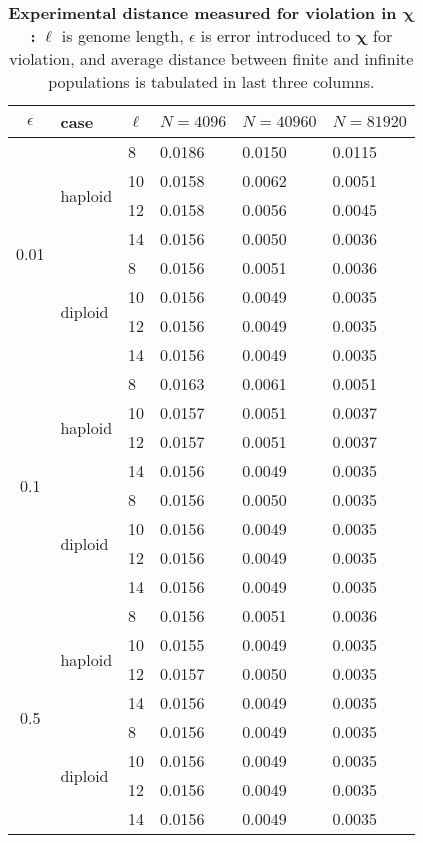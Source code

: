\begin{table}[ht]
\caption{\textbf{Experimental distance measured for violation in $\bm{\chi}$:} $\ell$ is genome length, 
$\epsilon$ is error introduced to $\bm{\chi}$ for violation, and average distance between finite and 
infinite populations is tabulated in last three columns.}
\centering
\begin{tabularx}{0.75\textwidth}{ c *{5}{X}}
\toprule
$\epsilon$ & case & $\ell$ & $N = 4096$ & $N = 40960$ & $N = 81920$  \\
\midrule
\multirow{8}{*}{0.01} & \multirow{4}{*}{haploid} 	& 8 & 0.0186	&  0.0150 	& 0.0115 \\
		      &   				& 10 & 0.0158	&  0.0062 	& 0.0051 \\ 
		      & 			 	& 12 & 0.0158	&  0.0056	& 0.0045 \\
		      &  	 			& 14 & 0.0156	&  0.0050	& 0.0036 \\ 
		      \cmidrule(l){2-6}
		      & \multirow{4}{*}{diploid} 	& 8 & 0.0156	&  0.0051	& 0.0036 \\
		      &  	 			& 10 & 0.0156	&  0.0049	& 0.0035 \\
		      & 			 	& 12 & 0.0156	&  0.0049	& 0.0035 \\
		      &  	 			& 14 & 0.0156	&  0.0049	& 0.0035 \\
		      \midrule
\multirow{8}{*}{0.1} & \multirow{4}{*}{haploid} 	& 8 & 0.0163	& 0.0061 	& 0.0051 \\
		      &   				& 10 & 0.0157	&  0.0051	& 0.0037 \\	
		      & 				& 12 & 0.0157	&  0.0051	& 0.0037 \\	
		      &  	 			& 14 & 0.0156	&  0.0049	& 0.0035 \\
		      \cmidrule(l){2-6}
		      & \multirow{4}{*}{diploid} 	& 8 & 0.0156	&  0.0050	& 0.0035 \\
		      &  	 			& 10 & 0.0156	&  0.0049	& 0.0035 \\
		      & 				& 12 & 0.0156	&  0.0049	& 0.0035 \\
		      &  	 			& 14 & 0.0156	&  0.0049	& 0.0035 \\
		      \midrule
\multirow{8}{*}{0.5} & \multirow{4}{*}{haploid} 	& 8 & 0.0156	&  0.0051	& 0.0036 \\
		      &   				& 10 & 0.0155	&  0.0049	& 0.0035 \\
		      & 				& 12 & 0.0157	&  0.0050	& 0.0035 \\
		      &  	 			& 14 & 0.0156	&  0.0049	& 0.0035 \\
		      \cmidrule(l){2-6}
		      & \multirow{4}{*}{diploid} 	& 8 & 0.0156	&  0.0049	& 0.0035 \\	
		      &  	 			& 10 & 0.0156	&  0.0049	& 0.0035 \\
		      &  				& 12 & 0.0156	&  0.0049	& 0.0035 \\
		      &  	 			& 14 & 0.0156	&  0.0049	& 0.0035 \\
\bottomrule
\end{tabularx}
\label{distanceChi}
\end{table} 


